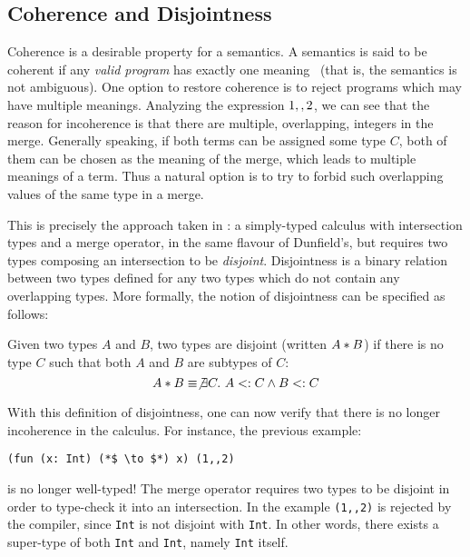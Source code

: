 \subsection{Coherence and Disjointness}
Coherence is a desirable property for a semantics. A semantics is said
to be coherent if any \emph{valid program} has exactly one
meaning~\cite{reynolds1991coherence} (that is, the semantics is not ambiguous).
One option to restore coherence is to reject programs which may have
multiple meanings.
Analyzing the expression $1 ,, 2$, we can see that the reason
for incoherence is that there are multiple, overlapping, integers in the
merge. Generally speaking, if both terms can be assigned some type $C$,
both of them can be chosen as the meaning of the merge,
which leads to multiple meanings of a term.
Thus a natural option is to try to forbid such overlapping
values of the same type in a merge.

This is precisely the approach taken in \oldname:  
a simply-typed calculus with intersection types and a merge operator, 
in the same flavour of Dunfield's, but requires two types composing an intersection 
to be \emph{disjoint}.  
Disjointness is a binary relation between two types defined for any two types which
do not contain any overlapping types.
More formally, the notion of disjointness can be specified as follows:

\begin{definition}[Disjointness]
  Given two types $A$ and $B$, two types are disjoint
  (written $A * B$) if there is no type $C$ such that both $A$ and $B$ are
  subtypes of $C$:
  \[A * B \equiv \not\exists C.~A <: C \wedge B <: C\]
\end{definition}

With this definition of disjointness, one can now verify that there is no longer
incoherence in the \oldname calculus.
For instance, the previous example: 
\begin{lstlisting}
(fun (x: Int) (*$ \to $*) x) (1,,2)
\end{lstlisting}
is no longer well-typed! 
The merge operator requires two types to be disjoint in order to type-check it into
an intersection.
In the example \lstinline$(1,,2)$ is rejected by the compiler, since \lstinline$Int$ is not
disjoint with \lstinline$Int$.
In other words, there exists a super-type of both \lstinline$Int$ and \lstinline$Int$, 
namely \lstinline$Int$ itself.

